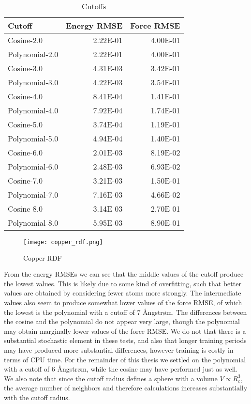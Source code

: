 \begin{table}
\begin{tabular}{lrr}
\toprule
         Cutoff &  Energy RMSE &  Force RMSE \\
\midrule
     Cosine-2.0 &     2.22E-01 &    4.00E-01 \\
 Polynomial-2.0 &     2.22E-01 &    4.00E-01 \\
     Cosine-3.0 &     4.31E-03 &    3.42E-01 \\
 Polynomial-3.0 &     4.22E-03 &    3.54E-01 \\
     Cosine-4.0 &     8.41E-04 &    1.41E-01 \\
 Polynomial-4.0 &     7.92E-04 &    1.74E-01 \\
     Cosine-5.0 &     3.74E-04 &    1.19E-01 \\
 Polynomial-5.0 &     4.94E-04 &    1.40E-01 \\
     Cosine-6.0 &     2.01E-03 &    8.19E-02 \\
 Polynomial-6.0 &     2.48E-03 &    6.93E-02 \\
     Cosine-7.0 &     3.21E-03 &    1.50E-01 \\
 Polynomial-7.0 &     7.16E-03 &    4.66E-02 \\
     Cosine-8.0 &     3.14E-03 &    2.70E-01 \\
 Polynomial-8.0 &     5.95E-03 &    8.90E-01 \\
\bottomrule
\end{tabular}
\caption{Cutoffs}
\label{table:cutoffs}
\end{table}

\begin{figure}
    \centering
    \texttt{[image: copper\_rdf.png]}
    \caption{Copper RDF}
    \label{fig:copper_rdf}
\end{figure}

From the energy RMSEs we can see that the middle values of the
cutoff produce the lowest values. This is likely due to some kind
of overfitting, such that better values are obtained by considering
fewer atoms more strongly. The intermediate values also
seem to produce somewhat lower values of the force RMSE,
of which the lowest is the polynomial with a cutoff of 7 Ångstrøm.
The differences between the cosine and the polynomial do not
appear very large, though the polynomial may obtain marginally
lower values of the force RMSE. We do not that there is a substantial
stochastic element in these tests, and also that longer training
periods may have produced more substantial differences, however
training is costly in terms of CPU time. For the remainder
of this thesis we settled on the polynomial with a cutoff of 6 Ångstrøm,
while the cosine may have performed just as well.
We also note that since the cutoff radius defines a sphere
with a volume $V \propto R_c^3$, the average number of neighbors and therefore
calculations increases substantially with the cutoff radius.

